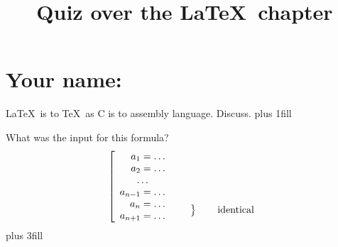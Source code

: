 \documentclass{artikel3}
\begin{document}
\title{Quiz over the \LaTeX\ chapter}
\author{}\date{}\maketitle

\section*{Your name:}

\vskip1cm

\LaTeX\ is to \TeX\ as C is to assembly language. Discuss.
\vskip 0pt plus 1fill

What was the input for this formula?
\[ \left[\begin{array}{r}a_1=\ldots\\ a_2=\ldots\\ 
  \multicolumn{1}{c}\ldots\\
  a_{n-1}=\ldots\\ a_n=\ldots\\ a_{n+1}=\ldots
  \end{array}\right.
%
\left.\begin{array}{c}\\ \\ \\ \\
        \left.\begin{array}{c}\\\end{array}\right\}
        \qquad\mathrm{identical}
\end{array}\right.
\]
\vskip 0pt plus 3fill
\end{document}
